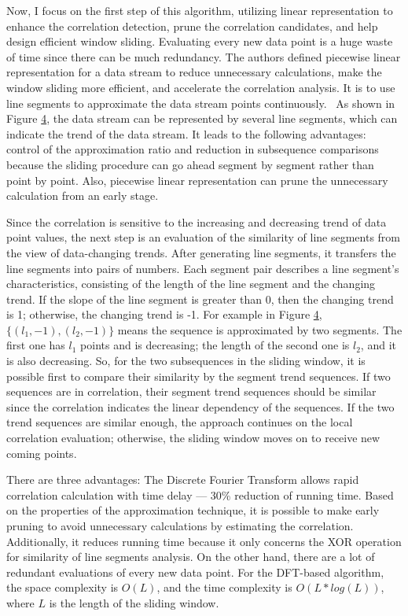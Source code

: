 Now, I focus on the first step of this algorithm, utilizing linear representation to enhance the correlation detection, prune the correlation candidates, and help design efficient window sliding. Evaluating every new data point is a huge waste of time since there can be much redundancy. The authors defined piecewise linear representation for a data stream to reduce unnecessary calculations, make the window sliding more efficient, and accelerate the correlation analysis. It is to use line segments to approximate the data stream points continuously.~\cite{ref7} As shown in Figure \hyperref[fig:DFT_PLR]{4}, the data stream can be represented by several line segments, which can indicate the trend of the data stream. It leads to the following advantages: control of the approximation ratio and reduction in subsequence comparisons because the sliding procedure can go ahead segment by segment rather than point by point. Also, piecewise linear representation can prune the unnecessary calculation from an early stage. \newline 

Since the correlation is sensitive to the increasing and decreasing trend of data point values, the next step is an evaluation of the similarity of line segments from the view of data-changing trends. After generating line segments, it transfers the line segments into pairs of numbers. Each segment pair describes a line segment's characteristics, consisting of the length of the line segment and the changing trend. If the slope of the line segment is greater than 0, then the changing trend is 1; otherwise, the changing trend is -1. For example in Figure \hyperref[fig:DFT_PLR]{4}, $\{(l_{1},-1),(l_{2},-1)\}$ means the sequence is approximated by two segments. The first one has $l_{1}$ points and is decreasing; the length of the second one is $l_{2}$, and it is also decreasing. So, for the two subsequences in the sliding window, it is possible first to compare their similarity by the segment trend sequences. If two sequences are in correlation, their segment trend sequences should be similar since the correlation indicates the linear dependency of the sequences. If the two trend sequences are similar enough, the approach continues on the local correlation evaluation; otherwise, the sliding window moves on to receive new coming points. \newline

There are three advantages: The Discrete Fourier Transform allows rapid correlation calculation with time delay — 30\% reduction of running time. Based on the properties of the approximation technique, it is possible to make early pruning to avoid unnecessary calculations by estimating the correlation. Additionally, it reduces running time because it only concerns the XOR operation for similarity of line segments analysis. On the other hand, there are a lot of redundant evaluations of every new data point. For the DFT-based algorithm, the space complexity is $O(L)$, and the time complexity is $O(L * log(L))$, where $L$ is the length of the sliding window.
